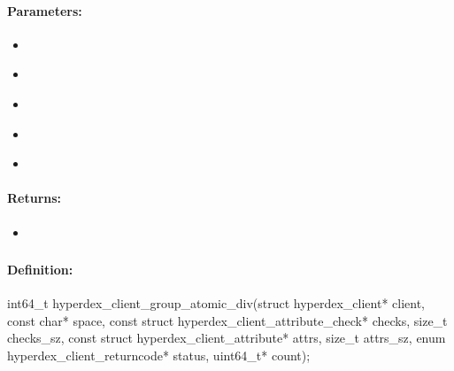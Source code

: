 \paragraph{Parameters:}
\begin{itemize}[noitemsep]
\item {}\\

\item {}\\

\item {}\\

\item {}\\

\item {}\\

\end{itemize}

\paragraph{Returns:}
\begin{itemize}[noitemsep]
\item {}\\

\end{itemize}

\pagebreak
\subsubsection{}
\label{api:c:group_atomic_div}


\paragraph{Definition:}
\begin{ccode}
int64_t hyperdex_client_group_atomic_div(struct hyperdex_client* client,
        const char* space,
        const struct hyperdex_client_attribute_check* checks, size_t checks_sz,
        const struct hyperdex_client_attribute* attrs, size_t attrs_sz,
        enum hyperdex_client_returncode* status,
        uint64_t* count);
\end{ccode}

